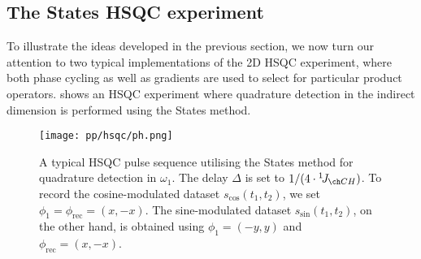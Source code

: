 \subsection{The States HSQC experiment}
\label{subsec:theory__hsqc_states}

To illustrate the ideas developed in the previous section, we now turn our attention to two typical implementations of the 2D HSQC experiment, where both phase cycling as well as gradients are used to select for particular product operators.
 shows an HSQC experiment where quadrature detection in the indirect dimension is performed using the States method.

\begin{figure}[htbp]
    \centering
    \texttt{[image: pp/hsqc/ph.png]}%
    \caption[Phase-sensitive HSQC pulse sequence with States method]{
        A typical HSQC pulse sequence utilising the States method for quadrature detection in $\omega_1$.
        The delay $\Delta$ is set to $1/(4 \cdot \oneJ{CH})$.
        To record the cosine-modulated dataset $s_\text{cos}(t_1, t_2)$, we set $\phi_1 = \phi_\text{rec} = (x, -x)$.
        The sine-modulated dataset $s_\text{sin}(t_1, t_2)$, on the other hand, is obtained using $\phi_1 = (-y, y)$ and $\phi_\text{rec} = (x, -x)$.
    }
    \label{fig:hsqc_ph}
\end{figure}

